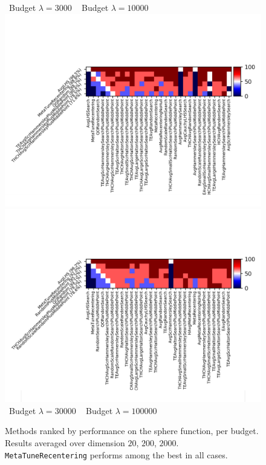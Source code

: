 \begin{figure}[t]
~\hfill Budget $\lambda=3000$ \hfill ~ \hfill Budget $\lambda=10000$ \hfill ~ \\
\includegraphics[trim={10 20 12 80}, clip,width=.48\textwidth]{sections/appendix/ppsn2020-rescaling/figures/fight_namesphere,budget30000.png}
\includegraphics[trim={10 20 12 80}, clip,width=.48\textwidth]{sections/appendix/ppsn2020-rescaling/figures/fight_namesphere,budget100000.png}\\
~\hfill Budget $\lambda=30000$ \hfill ~ \hfill Budget $\lambda=100000$ \hfill ~ \\
\caption{Methods ranked by performance on the sphere function, per budget. Results averaged over dimension $20$, $200$, $2000$. \texttt{MetaTuneRecentering} performs among the best in all cases.  }
    \label{toto}
\end{figure}
%
